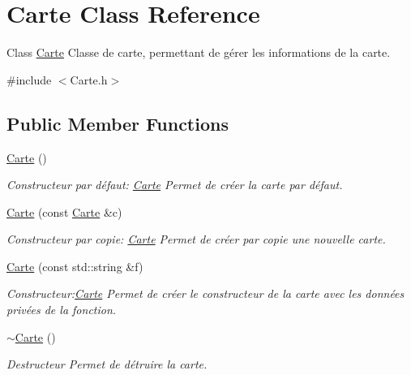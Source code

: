 \hypertarget{classCarte}{}\section{Carte Class Reference}
\label{classCarte}


Class \hyperlink{classCarte}{Carte} Classe de carte, permettant de gérer les informations de la carte.  




{\ttfamily \#include $<$Carte.\+h$>$}

\subsection*{Public Member Functions}
\begin{DoxyCompactItemize}
\item 
\hyperlink{classCarte_a06daaca86c31c80f8308f4a81d46dc9b}{Carte} ()
\begin{DoxyCompactList}\small\item\em Constructeur par défaut\+: \hyperlink{classCarte}{Carte} Permet de créer la carte par défaut. \end{DoxyCompactList}\item 
\hyperlink{classCarte_afe56c0ec89cb3cf0332755204b576a2d}{Carte} (const \hyperlink{classCarte}{Carte} \&c)
\begin{DoxyCompactList}\small\item\em Constructeur par copie\+: \hyperlink{classCarte}{Carte} Permet de créer par copie une nouvelle carte. \end{DoxyCompactList}\item 
\hyperlink{classCarte_acf6679e07683a19586bd9dc0f699d8b4}{Carte} (const std\+::string \&f)
\begin{DoxyCompactList}\small\item\em Constructeur\+:\hyperlink{classCarte}{Carte} Permet de créer le constructeur de la carte avec les données privées de la fonction. \end{DoxyCompactList}\item 
\mbox{\label{classCarte_a63300ff55c58b5d5b1674a3fc8f25910}} 
\hyperlink{classCarte_a63300ff55c58b5d5b1674a3fc8f25910}{$\sim$\+Carte} ()
\begin{DoxyCompactList}\small\item\em Destructeur Permet de détruire la carte. \end{DoxyCompactList}\item 

\end{DoxyCompactItemize}
